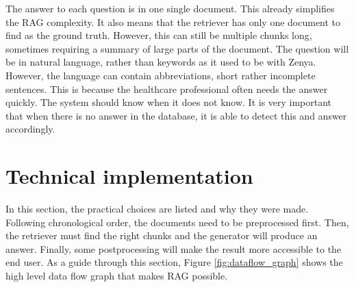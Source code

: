 The answer to each question is in one single document. This already simplifies the RAG complexity. It also means that the retriever has only one document to find as the ground truth. However, this can still be multiple chunks long, sometimes requiring a summary of large parts of the document.
The question will be in natural language, rather than keywords as it used to be with Zenya. However, the language can contain abbreviations, short rather incomplete sentences. This is because the healthcare professional often needs the answer quickly.
The system should know when it does not know. It is very important that when there is no answer in the database, it is able to detect this and answer accordingly.

\section{Technical implementation}
In this section, the practical choices are listed and why they were made. Following chronological order, the documents need to be preprocessed first. Then, the retriever must find the right chunks and the generator will produce an answer. Finally, some postprocessing will make the result more accessible to the end user. As a guide through this section, Figure \ref{fig:dataflow_graph} shows the high level data flow graph that makes RAG possible.

